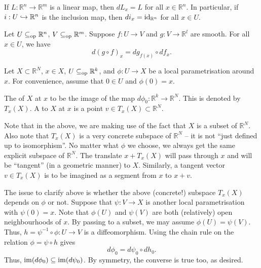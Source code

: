 \begin{ex}
	If $L : \mathbb{R}^{n} \to \mathbb{R}^{m}$ is a linear map, then $dL_{x} = L$ for all $x \in \mathbb{R}^{n}$. \newline
	In particular, if $i : U \hookrightarrow \mathbb{R}^{n}$ is the inclusion map, then $di_{x} = \operatorname{id}_{\mathbb{R}^{n}}$ for all $x \in U$.
\end{ex}

\begin{thm}
	Let $U \subseteq_{\operatorname{op}} \mathbb{R}^{n}$, $V \subseteq_{\operatorname{op}} \mathbb{R}^{m}$. Suppose $f : U \to V$ and $g : V \to \mathbb{R}^{l}$ are smooth. For all $x \in U$, we have
	\begin{equation*} 
		d(g \circ f)_{x} = dg_{f(x)} \circ df_{x}.
	\end{equation*}
\end{thm}

\begin{defn}
	Let $X \subset \mathbb{R}^{N}$, $x \in X$, $U \subseteq_{\operatorname{op}} \mathbb{R}^{k}$, and $\phi : U \to X$ be a local parametrisation around $x$. For convenience, assume that $0 \in U$ and $\phi(0) = x$.

	The  of $X$ at $x$ to be the image of the map $d \phi_{0} : \mathbb{R}^{k} \to \mathbb{R}^{N}$. This is denoted by $T_{x}(X)$. \newline
	A  to $X$ at $x$ is a point $v \in T_{x}(X) \subset \mathbb{R}^{N}$.
\end{defn}

Note that in the above, we are making use of the fact that $X$ is a subset of $\mathbb{R}^{N}$. Also note that $T_{x}(X)$ is a very concrete subspace of $\mathbb{R}^{N}$ -- it is not ``just defined up to isomorphism''. No matter what $\phi$ we choose, we always get the same explicit subspace of $\mathbb{R}^{N}$. The translate $x + T_{x}(X)$ will pass through $x$ and will be ``tangent'' (in a geometric manner) to $X$. Similarly, a tangent vector $v \in T_{x}(X)$ is to be imagined as a segment from $x$ to $x + v$.

The issue to clarify above is whether the above (concrete!) subspace $T_{x}(X)$ depends on $\phi$ or not. Suppose that $\psi : V \to X$ is another local parametrisation with $\psi(0) = x$. Note that $\phi(U)$ and $\psi(V)$ are both (relatively) open neighbourhoods of $x$. By passing to a subset, we may assume $\phi(U) = \psi(V)$. Thus, $h = \psi^{-1} \circ \phi : U \to V$ is a diffeomorphism. Using the chain rule on the relation $\phi = \psi \circ h$ gives
\begin{equation*} 
	d \phi_{0} = d \psi_{0} \circ d h_{0}.
\end{equation*}
Thus, $\operatorname{im}(d \phi_{0}) \subseteq \operatorname{im}(d \psi_{0})$. By symmetry, the converse is true too, as desired.

